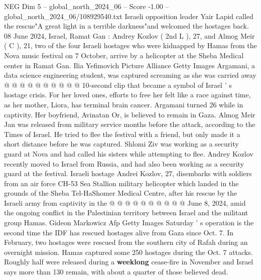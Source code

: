 \begin{textsample}{NEG Dim 5 – global\_north\_2024\_06 – Score -1.00 – global\_north\_2024\_06/108929540.txt}
Israeli opposition leader Yair Lapid called the rescue"A great light in a terrible darkness"and welcomed the hostages back. 08 June 2024, Israel, Ramat Gan : Andrey Kozlov ( 2nd L ), 27, and Almog Meir ( C ), 21, two of the four Israeli hostages who were kidnapped by Hamas from the Nova music festival on 7 October, arrive by a helicopter at the Sheba Medical center in Ramat Gan.
Ilia Yefimovich Picture Alliance Getty Images Argamani, a data science engineering student, was captured screaming as she was carried away @ @ @ @ @ @ @ @ @ @ 10-second clip that became a symbol of Israel ' s hostage crisis.
For her loved ones, efforts to free her felt like a race against time, as her mother, Liora, has terminal brain cancer.
Argamani turned 26 while in captivity.
Her boyfriend, Avinatan Or, is believed to remain in Gaza.
Almog Meir Jan was released from military service months before the attack, according to the Times of Israel.
He tried to flee the festival with a friend, but only made it a short distance before he was captured.
Shlomi Ziv was working as a security guard at Nova and had called his sisters while attempting to flee.
Andrey Kozlov recently moved to Israel from Russia, and had also been working as a security guard at the festival.
Israeli hostage Andrei Kozlov, 27, disembarks with soldiers from an air force CH-53 Sea Stallion military helicopter which landed in the grounds of the Sheba Tel-HaShomer Medical Centre, after his rescue by the Israeli army from captivity in the @ @ @ @ @ @ @ @ @ @ June 8, 2024, amid the ongoing conflict in the Palestinian territory between Israel and the militant group Hamas.
Gideon Markowicz Afp Getty Images Saturday ' s operation is the second time the IDF has rescued hostages alive from Gaza since Oct. 7.
In February, two hostages were rescued from the southern city of Rafah during an overnight mission.
Hamas captured some 250 hostages during the Oct. 7 attacks.
Roughly half were released during a \textbf{weeklong} cease-fire in November and Israel says more than 130 remain, with about a quarter of those believed dead.

\end{textsample}
